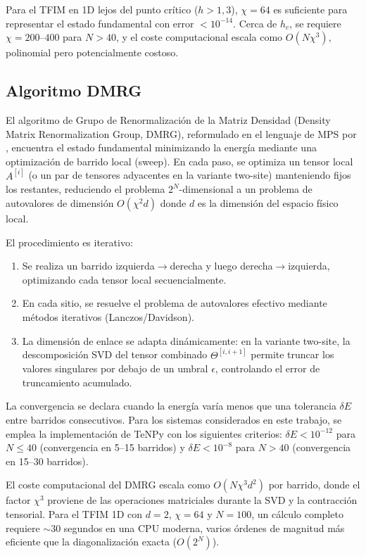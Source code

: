 \documentclass[11pt,a4paper,spanish]{book}
\begin{document}
Para el TFIM en 1D lejos del punto crítico ($h > 1,3$), $\chi = 64$ es suficiente para representar el estado fundamental con error $< 10^{-14}$. Cerca de $h_c$, se requiere $\chi = 200$--$400$ para $N > 40$, y el coste computacional escala como $O(N \chi^3)$, polinomial pero potencialmente costoso.

\subsection{Algoritmo DMRG}

El algoritmo de Grupo de Renormalización de la Matriz Densidad (Density Matrix Renormalization Group, DMRG), reformulado en el lenguaje de MPS por \citet{schollwock2011}, encuentra el estado fundamental minimizando la energía mediante una optimización de barrido local (sweep). En cada paso, se optimiza un tensor local $A^{[i]}$ (o un par de tensores adyacentes en la variante two-site) manteniendo fijos los restantes, reduciendo el problema $2^N$-dimensional a un problema de autovalores de dimensión $O(\chi^2 d)$ donde $d$ es la dimensión del espacio físico local.

El procedimiento es iterativo:
\begin{enumerate}
    \item Se realiza un barrido izquierda$\to$derecha y luego derecha$\to$izquierda, optimizando cada tensor local secuencialmente.
    \item En cada sitio, se resuelve el problema de autovalores efectivo mediante métodos iterativos (Lanczos/Davidson).
    \item La dimensión de enlace se adapta dinámicamente: en la variante two-site, la descomposición SVD del tensor combinado $\Theta^{[i,i+1]}$ permite truncar los valores singulares por debajo de un umbral $\epsilon$, controlando el error de truncamiento acumulado.
\end{enumerate}

La convergencia se declara cuando la energía varía menos que una tolerancia $\delta E$ entre barridos consecutivos. Para los sistemas considerados en este trabajo, se emplea la implementación de TeNPy \citep{hauschild2018} con los siguientes criterios: $\delta E < 10^{-12}$ para $N \leq 40$ (convergencia en 5--15 barridos) y $\delta E < 10^{-8}$ para $N > 40$ (convergencia en 15--30 barridos).

El coste computacional del DMRG escala como $O(N \chi^3 d^2)$ por barrido, donde el factor $\chi^3$ proviene de las operaciones matriciales durante la SVD y la contracción tensorial. Para el TFIM 1D con $d = 2$, $\chi = 64$ y $N = 100$, un cálculo completo requiere $\sim$30 segundos en una CPU moderna, varios órdenes de magnitud más eficiente que la diagonalización exacta ($O(2^N)$).
\end{document}
